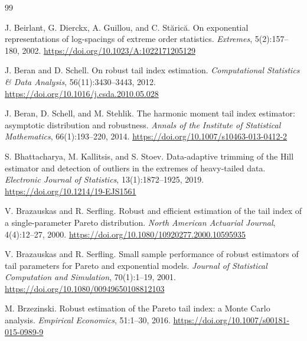 \documentclass[11pt]{article}
\begin{document}
\begin{thebibliography}{99}

J. Beirlant, G. Dierckx, A. Guillou, and C. St\u{a}ric\u{a}.
\newblock On exponential representations of log-spacings of extreme order
statistics.
\newblock \emph{Extremes}, 5(2):157--180, 2002.
\newblock \url{https://doi.org/10.1023/A:1022171205129}

J. Beran and D. Schell.
\newblock On robust tail index estimation.
\newblock \emph{Computational Statistics \& Data Analysis}, 56(11):3430--3443,
2012.
\newblock \url{https://doi.org/10.1016/j.csda.2010.05.028}

J. Beran, D. Schell, and M. Stehlik.
\newblock The harmonic moment tail index estimator: asymptotic distribution
and robustness.
\newblock \emph{Annals of the Institute of Statistical Mathematics},
66(1):193--220, 2014.
\newblock \url{https://doi.org/10.1007/s10463-013-0412-2}

S. Bhattacharya, M. Kallitsis, and S. Stoev.
\newblock Data-adaptive trimming of the Hill estimator and detection of
outliers in the extremes of heavy-tailed data.
\newblock \emph{Electronic Journal of Statistics}, 13(1):1872--1925, 2019.
\newblock \url{https://doi.org/10.1214/19-EJS1561}

V. Brazauskas and R. Serfling.
\newblock Robust and efficient estimation of the tail index of a
single-parameter Pareto distribution.
\newblock \emph{North American Actuarial Journal}, 4(4):12--27, 2000.
\newblock \url{https://doi.org/10.1080/10920277.2000.10595935}

V. Brazauskas and R. Serfling.
\newblock Small sample performance of robust estimators of tail parameters for
Pareto and exponential models.
\newblock \emph{Journal of Statistical Computation and Simulation},
70(1):1--19, 2001.
\newblock \url{https://doi.org/10.1080/00949650108812103}

M. Brzezinski.
\newblock Robust estimation of the Pareto tail index: a Monte Carlo analysis.
\newblock \emph{Empirical Economics}, 51:1--30, 2016.
\newblock \url{https://doi.org/10.1007/s00181-015-0989-9}


\end{thebibliography}
\end{document}
